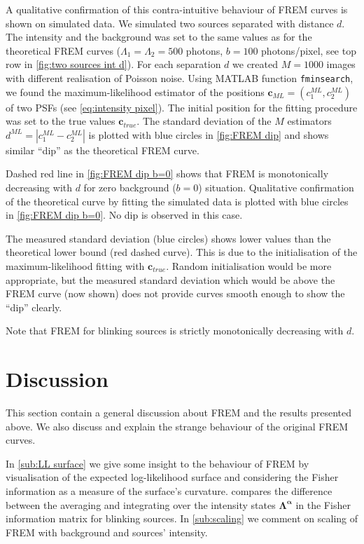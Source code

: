 A qualitative confirmation of this contra-intuitive behaviour of FREM curves is shown on simulated data. We simulated two sources separated with distance $d$. The intensity and the background was set to the same values as for the theoretical FREM curves ($\Lambda_1=\Lambda_2=500$ photons, $b=100$ photons/pixel, see top row in \autoref{fig:two sources int d}). For each separation $d$ we created $M=1000$ images with different realisation of Poisson noise. Using MATLAB function {\tt fminsearch}, we found the maximum-likelihood estimator of the positions $\bm{c}_{ML}=(c^{ML}_1,c^{ML}_2)$ of two PSFs (see \autoref{eq:intensity pixel}). The initial position for the fitting procedure was set to the true values $\bm{c}_{true}$. The standard deviation of the $M$ estimators $d^{ML}=|c^{ML}_1-c^{ML}_2|$ is plotted with blue circles in \autoref{fig:FREM dip} and shows similar ``dip'' as the theoretical FREM curve.

Dashed red line in \autoref{fig:FREM dip b=0} shows that FREM is monotonically decreasing with $d$ for zero background ($b=0$) situation. Qualitative confirmation of the theoretical curve by fitting the simulated data is plotted with blue circles in \autoref{fig:FREM dip b=0}. No dip is observed in this case. 

The measured standard deviation (blue circles) shows lower values than the theoretical lower bound (red dashed curve). This is due to the initialisation of the maximum-likelihood fitting with $\bm{c}_{true}$. Random initialisation would be more appropriate, but the measured standard deviation which would be above the FREM curve (now shown) does not provide curves smooth enough to show the ``dip'' clearly.

Note that FREM for blinking sources is strictly monotonically decreasing with $d$. 



\clearpage
\section{Discussion\label{sec:FREM discussion}}

This section contain a general discussion about FREM and the results presented above. We also discuss and explain the strange behaviour of the original FREM curves. 

In \autoref{sub:LL surface} we give some insight to the behaviour of FREM by visualisation of the expected log-likelihood surface and considering the Fisher information as a measure of the surface's curvature.  compares the difference between the averaging and integrating over the intensity states $\bm{\Lambda^\alpha}$ in the Fisher information matrix for blinking sources. In \autoref{sub:scaling} we comment on scaling of FREM with background and sources' intensity.  


